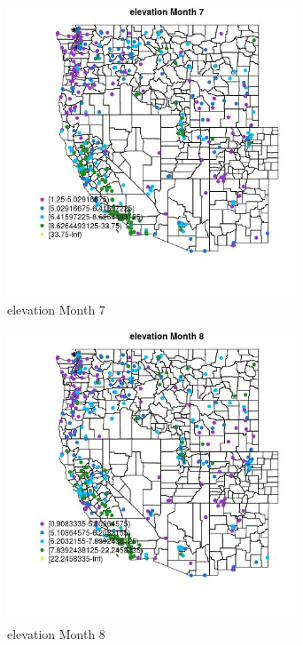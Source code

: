 \begin{figure} 
\centering  
\includegraphics[width=0.77\textwidth]{Code_Outputs/ML_input_report_ML_input_PM25_Step5_part_d_de_duplicated_aves_ML_input_MapObsMo7elevation.jpg} 
\caption{\label{fig:ML_input_report_ML_input_PM25_Step5_part_d_de_duplicated_aves_ML_inputMapObsMo7elevation}elevation Month 7} 
\end{figure} 
 

\begin{figure} 
\centering  
\includegraphics[width=0.77\textwidth]{Code_Outputs/ML_input_report_ML_input_PM25_Step5_part_d_de_duplicated_aves_ML_input_MapObsMo8elevation.jpg} 
\caption{\label{fig:ML_input_report_ML_input_PM25_Step5_part_d_de_duplicated_aves_ML_inputMapObsMo8elevation}elevation Month 8} 
\end{figure} 
 

